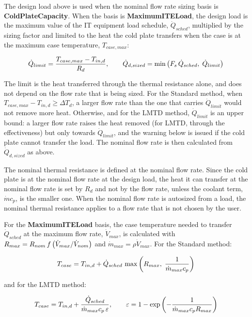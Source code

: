 The design load above is used when the nominal flow rate sizing basis is \textbf{ColdPlateCapacity}. When the basis is \textbf{MaximumITELoad}, the design load is the maximum value of the IT equipment load schedule, \(\dot{Q}_{sched}\), multiplied by the sizing factor and limited to the heat the cold plate transfers when the case is at the maximum case temperature, \(T_{case,max}\):

\begin{equation}
\dot{Q}_{limit} = \frac{T_{case,max} - T_{in,d}}{R_{d}}, \qquad \dot{Q}_{d,sized} = \min\left(F_{s} \, \dot{Q}_{sched}, \; \dot{Q}_{limit}\right)
\end{equation}

The limit is the heat transferred through the thermal resistance alone, and does not depend on the flow rate that is being sized. For the Standard method, when \(T_{case,max} - T_{in,d} \geq \Delta T_{d}\), a larger flow rate than the one that carries \(\dot{Q}_{limit}\) would not remove more heat. Otherwise, and for the LMTD method, \(\dot{Q}_{limit}\) is an upper bound: a larger flow rate raises the heat removed (for LMTD, through the effectiveness) but only towards \(\dot{Q}_{limit}\), and the warning below is issued if the cold plate cannot transfer the load. The nominal flow rate is then calculated from \(\dot{Q}_{d,sized}\) as above.

The nominal thermal resistance is defined at the nominal flow rate. Since the cold plate is at the nominal flow rate at the design load, the heat it can transfer at the nominal flow rate is set by \(R_{d}\) and not by the flow rate, unless the coolant term, \(\dot{m} c_p\), is the smaller one. When the nominal flow rate is autosized from a load, the nominal thermal resistance applies to a flow rate that is not chosen by the user.

For the \textbf{MaximumITELoad} basis, the case temperature needed to transfer \(\dot{Q}_{sched}\) at the maximum flow rate, \(\dot{V}_{max}\), is calculated with \(R_{max} = R_{nom} \, f\left(\dot{V}_{max} / \dot{V}_{nom}\right)\) and \(\dot{m}_{max} = \rho \dot{V}_{max}\). For the Standard method:

\begin{equation}
T_{case} = T_{in,d} + \dot{Q}_{sched} \, \max\left(R_{max}, \; \frac{1}{\dot{m}_{max} c_p}\right)
\end{equation}

and for the LMTD method:

\begin{equation}
T_{case} = T_{in,d} + \frac{\dot{Q}_{sched}}{\dot{m}_{max} c_p \, \varepsilon}, \qquad \varepsilon = 1 - \exp\left(-\frac{1}{\dot{m}_{max} c_p R_{max}}\right)
\end{equation}

